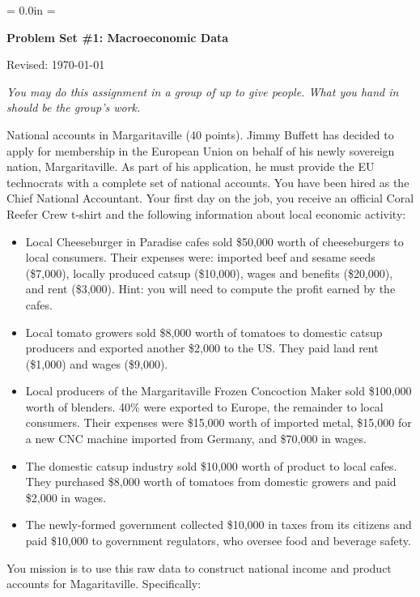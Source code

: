 \documentclass[12pt]{exam}
\def\HeadName{Problem Set \#1}
\begin{document}
\parindent = 0.0in
\parskip = \bigskipamount
\thispagestyle{empty}%
\Head

\centerline{\large \bf \HeadName: Macroeconomic Data}
\centerline{Revised:  \today}

\medskip
{\it You may do this assignment in a group of up to give people.  
What you hand in should be the group's work.}

\begin{questions}
\question National accounts in Margaritaville (40 points).
Jimmy Buffett has decided to apply for membership in the European Union 
on behalf of his newly sovereign nation, Margaritaville. 
As part of his application, he must provide the EU
technocrats with a complete set of national accounts.  
You have been hired as the Chief National Accountant. 
Your first day on the job, 
you receive an official Coral Reefer Crew{\texttrademark} t-shirt
and the following information about local economic activity:
%
\begin{itemize}
\item Local Cheeseburger in Paradise{\texttrademark} cafes
sold \$50,000 worth of cheeseburgers to local consumers.  
Their expenses were:  imported beef and sesame seeds (\$7,000), 
locally produced catsup (\$10,000), 
wages and benefits (\$20,000), and rent (\$3,000).  
Hint: you will need to compute the profit earned by the cafes.  

\item Local tomato growers sold \$8,000 worth of tomatoes to domestic
catsup producers and exported another \$2,000 to the US.  
They paid land rent (\$1,000) and wages (\$9,000).  

\item Local producers of the Margaritaville Frozen Concoction Maker{\texttrademark }
sold \$100,000 worth of blenders.
40\% were exported to Europe, the remainder to local consumers.  
Their expenses were \$15,000 worth of imported metal, 
\$15,000 for a new CNC machine imported from Germany, 
and \$70,000 in wages.  

\item The domestic catsup industry sold \$10,000 worth of product to local 
cafes.  
They purchased \$8,000 worth of tomatoes from domestic growers 
and paid \$2,000 in wages.  


\item The newly-formed government collected \$10,000 in taxes from its citizens
and paid \$10,000 to government regulators, who oversee food and beverage safety.  
\end{itemize}
%
You mission is to use this raw data to construct 
national income and product accounts for Magaritaville.  
Specifically:
%
\begin{parts}

\end{parts}
\end{questions}
\end{document}
